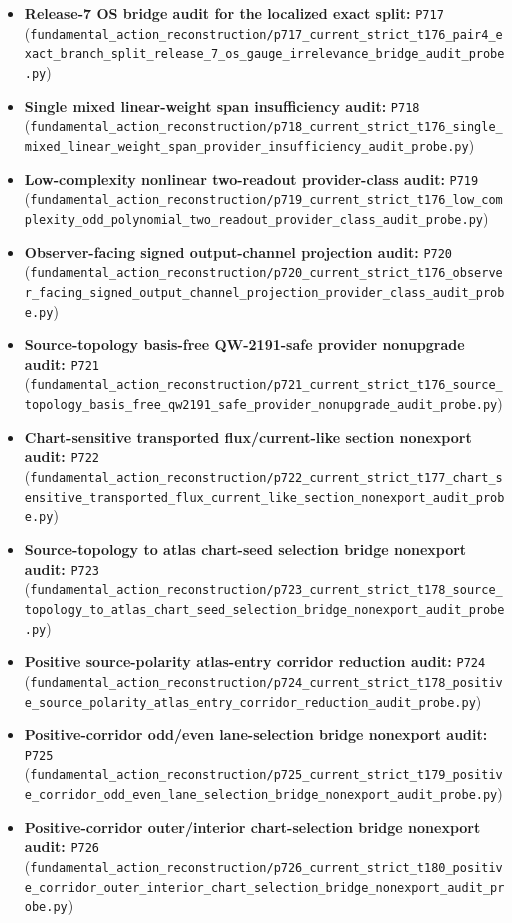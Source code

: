 \documentclass[11pt,a4paper]{article}
\begin{document}
\begin{itemize}
  \item \textbf{Release-7 OS bridge audit for the localized exact split:} \texttt{P717} (\verb|fundamental_action_reconstruction/p717_current_strict_t176_pair4_exact_branch_split_release_7_os_gauge_irrelevance_bridge_audit_probe.py|)
  \item \textbf{Single mixed linear-weight span insufficiency audit:} \texttt{P718} (\verb|fundamental_action_reconstruction/p718_current_strict_t176_single_mixed_linear_weight_span_provider_insufficiency_audit_probe.py|)
  \item \textbf{Low-complexity nonlinear two-readout provider-class audit:} \texttt{P719} (\verb|fundamental_action_reconstruction/p719_current_strict_t176_low_complexity_odd_polynomial_two_readout_provider_class_audit_probe.py|)
  \item \textbf{Observer-facing signed output-channel projection audit:} \texttt{P720} (\verb|fundamental_action_reconstruction/p720_current_strict_t176_observer_facing_signed_output_channel_projection_provider_class_audit_probe.py|)
  \item \textbf{Source-topology basis-free QW-2191-safe provider nonupgrade audit:} \texttt{P721} (\verb|fundamental_action_reconstruction/p721_current_strict_t176_source_topology_basis_free_qw2191_safe_provider_nonupgrade_audit_probe.py|)
  \item \textbf{Chart-sensitive transported flux/current-like section nonexport audit:} \texttt{P722} (\verb|fundamental_action_reconstruction/p722_current_strict_t177_chart_sensitive_transported_flux_current_like_section_nonexport_audit_probe.py|)
  \item \textbf{Source-topology to atlas chart-seed selection bridge nonexport audit:} \texttt{P723} (\verb|fundamental_action_reconstruction/p723_current_strict_t178_source_topology_to_atlas_chart_seed_selection_bridge_nonexport_audit_probe.py|)
  \item \textbf{Positive source-polarity atlas-entry corridor reduction audit:} \texttt{P724} (\verb|fundamental_action_reconstruction/p724_current_strict_t178_positive_source_polarity_atlas_entry_corridor_reduction_audit_probe.py|)
  \item \textbf{Positive-corridor odd/even lane-selection bridge nonexport audit:} \texttt{P725} (\verb|fundamental_action_reconstruction/p725_current_strict_t179_positive_corridor_odd_even_lane_selection_bridge_nonexport_audit_probe.py|)
  \item \textbf{Positive-corridor outer/interior chart-selection bridge nonexport audit:} \texttt{P726} (\verb|fundamental_action_reconstruction/p726_current_strict_t180_positive_corridor_outer_interior_chart_selection_bridge_nonexport_audit_probe.py|)

\end{itemize}
\end{document}

